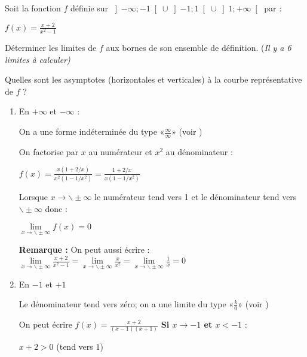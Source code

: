 
%
Soit la fonction $f$ définie sur $\left]-\infty  ; -1\right[ \cup  \left]-1 ; 1\right[ \cup  \left]1 ; +\infty \right[ $ par :
\par
$f\left(x\right)=\frac{x+2}{x^{2}-1}$
\par
Déterminer les limites de $f$ aux bornes de son ensemble de définition. (\textit{Il y a 6 limites à calculer)}
\par
Quelles sont les asymptotes (horizontales et verticales) à la courbe représentative de $f$ ?
\begin{corrige}
     \begin{enumerate}
          \item
          En $+\infty $ et $-\infty $ :
          \par
          On a une forme indéterminée du type «$\frac{\infty}{\infty} $» (voir )
          \par
          On factorise par $x$ au numérateur et $x^{2}$ au dénominateur :
          \par
          $f\left(x\right)=\frac{x\left(1+2/x\right)}{x^{2}\left(1-1/x^{2}\right)}=\frac{1+2/x}{x\left(1-1/x^{2}\right)}  $
          \par
          Lorsque $x\rightarrow \backslash\pm \infty $ le numérateur tend vers 1 et le dénominateur tend vers $\backslash\pm \infty $ donc :
          \par
          $\lim\limits_{x\rightarrow \backslash\pm \infty }f\left(x\right)=0$
\par
          \textbf{Remarque :} On peut aussi écrire : $\lim\limits_{x\rightarrow \backslash\pm \infty }\frac{x+2}{x^{2}-1}=\lim\limits_{x\rightarrow \backslash\pm \infty }\frac{x}{x^{2}}=\lim\limits_{x\rightarrow \backslash\pm \infty }\frac{1}{x}=0$
          \item
          En $-1$ et $+1$
          \par
          Le dénominateur tend vers zéro; on a une limite du type «$\frac{k}{0}$» (voir )
          \par
          On peut écrire $f\left(x\right)=\frac{x+2}{\left(x-1\right)\left(x+1\right)}$
          \textbf{Si $x\rightarrow -1$ et $x < -1$} :
          \par
          $x+2 > 0$ (tend vers $1$)

\end{enumerate}
\end{corrige}
